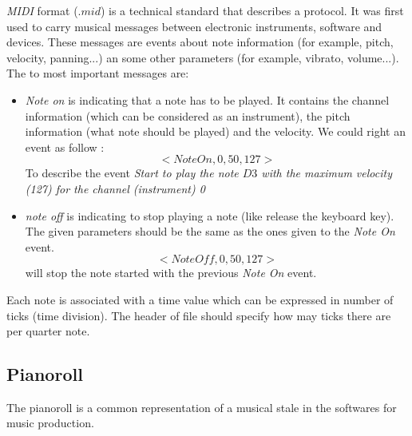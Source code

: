 \documentclass[12pt]{report}
\begin{document}


\textit{MIDI} format ($.mid$) is a technical standard that describes a protocol.
It was first used to carry musical messages between electronic instruments, software and devices. These messages are events about note information (for example, pitch, velocity, panning...) an some other parameters (for example, vibrato, volume...). 
The to most important messages are:
\begin{itemize}
    \item \textit{Note on} is indicating that a note has to be played. It contains the channel information (which can be considered as an instrument), the pitch information (what note should be played) and the velocity. We could right an event as follow :
    \begin{equation}
        <NoteOn, 0, 50, 127>
    \end{equation}
    To describe the event \textit{Start to play the note $D3$ with the maximum velocity (127) for the channel (instrument) 0}
    \item \textit{note off} is indicating to stop playing a note (like release the keyboard key). The given parameters should be the same as the ones given to the \textit{Note On} event.
    \begin{equation}
        <NoteOff, 0, 50, 127>
    \end{equation}
    will stop the note started with the previous \textit{Note On} event.
\end{itemize}

Each note is associated with a time value which can be expressed in number of ticks (time division). The header of file should specify how may ticks there are per quarter note.

\subsection{Pianoroll}

The pianoroll is a common representation of a musical stale in the softwares for music production.
\end{document}
